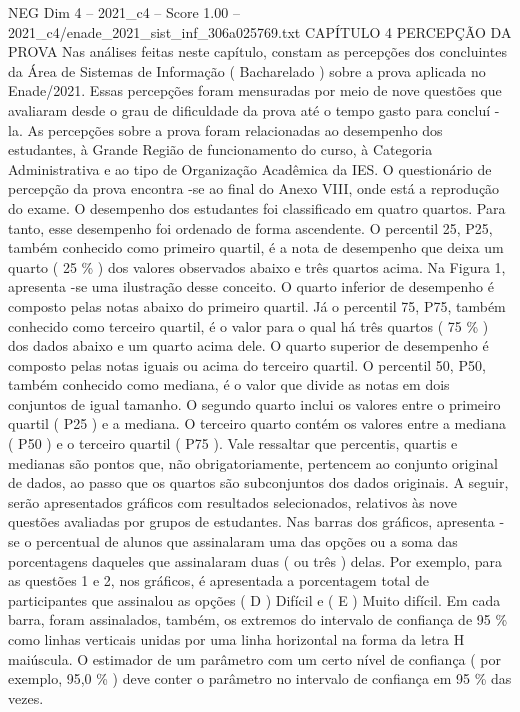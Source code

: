 \begin{textsample}{NEG Dim 4 – 2021\_c4 – Score 1.00 – 2021\_c4/enade\_2021\_sist\_inf\_306a025769.txt}  \label{ex:f4_neg_220}
CAPÍTULO 4 PERCEPÇÃO DA PROVA Nas análises feitas neste capítulo, constam as percepções dos concluintes da Área de Sistemas de Informação ( Bacharelado ) sobre a prova aplicada no Enade/2021.
Essas percepções foram mensuradas por meio de nove questões que avaliaram desde o grau de dificuldade da prova até o tempo gasto para concluí -la.
As percepções sobre a prova foram relacionadas ao desempenho dos estudantes, à Grande Região de funcionamento do curso, à Categoria Administrativa e ao tipo de Organização Acadêmica da IES.
O questionário de percepção da prova encontra -se ao final do Anexo VIII, onde está a reprodução do exame.
O desempenho dos estudantes foi classificado em quatro quartos.
Para tanto, esse desempenho foi ordenado de forma ascendente.
O percentil 25, P25, também conhecido como primeiro quartil, é a nota de desempenho que deixa um quarto ( 25 \% ) dos valores observados abaixo e três quartos acima.
Na Figura 1, apresenta -se uma ilustração desse conceito.
O quarto inferior de desempenho é composto pelas notas abaixo do primeiro quartil.
Já o percentil 75, P75, também conhecido como terceiro quartil, é o valor para o qual há três quartos ( 75 \% ) dos dados abaixo e um quarto acima dele.
O quarto superior de desempenho é composto pelas notas iguais ou acima do terceiro quartil.
O percentil 50, P50, também conhecido como mediana, é o valor que divide as notas em dois conjuntos de igual tamanho.
O segundo quarto inclui os valores entre o primeiro quartil ( P25 ) e a mediana.
O terceiro quarto contém os valores entre a mediana ( P50 ) e o terceiro quartil ( P75 ).
Vale ressaltar que percentis, quartis e medianas são pontos que, não obrigatoriamente, pertencem ao conjunto original de dados, ao passo que os quartos são subconjuntos dos dados originais.
A seguir, serão apresentados gráficos com resultados selecionados, relativos às nove questões avaliadas por grupos de estudantes.
Nas barras dos gráficos, apresenta -se o percentual de alunos que assinalaram uma das opções ou a soma das porcentagens daqueles que assinalaram duas ( ou três ) delas.
Por exemplo, para as questões 1 e 2, nos gráficos, é apresentada a porcentagem total de participantes que assinalou as opções ( D ) Difícil e ( E ) Muito difícil.
Em cada barra, foram assinalados, também, os extremos do intervalo de confiança de 95 \% como linhas verticais unidas por uma linha horizontal na forma da letra H maiúscula.
O estimador de um parâmetro com um certo nível de confiança ( por exemplo, 95,0 \% ) deve conter o parâmetro no intervalo de confiança em 95 \% das vezes.

\end{textsample}
